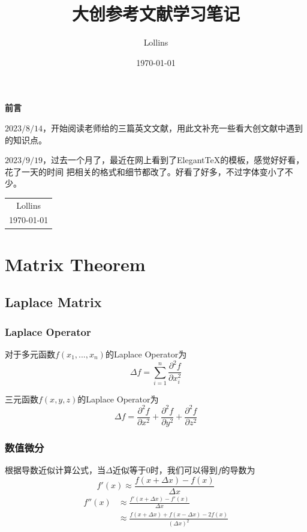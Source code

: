 \documentclass[lang=cn,10pt]{elegantbook}
\title{大创参考文献学习笔记}
\author{Lollins}
\date{\today}
\begin{document}
\maketitle

\setcounter{page}{1}

\begin{center}
	\Huge\textbf{前言}
\end{center}
\par
$2023/8/14$，开始阅读老师给的三篇英文文献，用此文补充一些看大创文献中遇到的知识点。

$2023/9/19$，过去一个月了，最近在网上看到了Elegant\TeX 的模板，感觉好好看，花了一天的时间
把相关的格式和细节都改了。好看了好多，不过字体变小了不少。

\begin{flushright}
	\begin{tabular}{c}
		Lollins \\
		\today
	\end{tabular}
\end{flushright}

\newpage
\tableofcontents
\newpage

\chapter{Matrix Theorem}

\section{Laplace Matrix}
\subsection*{Laplace Operator}
\par 对于多元函数$f(x_1,...,x_n)$的Laplace Operator为
\begin{equation}
	\Delta f=\sum_{i=1}^n\frac{\partial^2f}{\partial x_i^2}
\end{equation}
\begin{example}
	三元函数$f(x,y,z)$的Laplace Operator为
	$$
		\Delta f=\frac{\partial^2f}{\partial x^2} + \frac{\partial^2f}{\partial y^2} + \frac{\partial^2f}{\partial z^2}
	$$
\end{example}

\subsection*{数值微分}
\par 根据导数近似计算公式，当$\Delta$近似等于$0$时，我们可以得到$f$的导数为
\begin{equation*}
	f'(x)\approx \frac{f(x+\Delta x) - f(x)}{\Delta x}
\end{equation*}
\begin{equation*}
	\begin{aligned}
		f''(x) & \approx \frac{f'(x+\Delta x) - f'(x)}{\Delta x}                    \\
		       & \approx \frac{f(x+\Delta x) + f(x-\Delta x) - 2f(x)}{(\Delta x)^2}
	\end{aligned}
\end{equation*}
\end{document}
